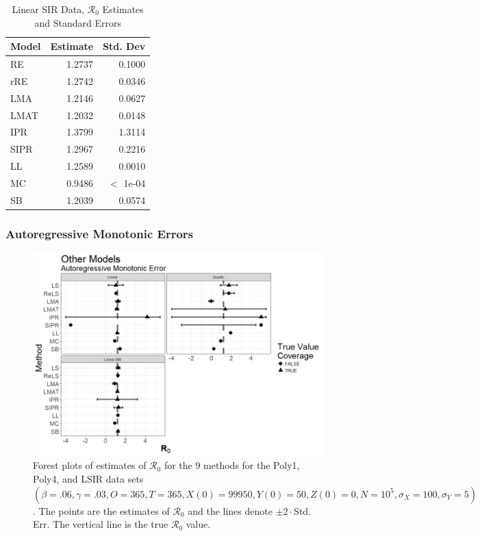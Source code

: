 \documentclass[12pt]{article}
\newcommand{\xxsir}{\ensuremath{9} } %
\newcommand{\rr}{\ensuremath{\mathcal{R}_0}}
\begin{document}
\begin{table}[H]
	
	\centering
	\begin{tabular}[t]{l|r|r}
		\hline
		Model & Estimate & Std. Dev\\
		\hline
		RE & 1.2737 & 0.1000\\
		\hline
		rRE & 1.2742 & 0.0346\\
		\hline
		LMA & 1.2146 & 0.0627\\
		\hline
		LMAT & 1.2032 & 0.0148\\
		\hline
		IPR & 1.3799 & 1.3114\\
		\hline
		SIPR & 1.2967 & 0.2216\\
		\hline
		LL & 1.2589 & 0.0010\\
		\hline
		MC & 0.9486 & $<$ 1e-04\\
		\hline
		SB & 1.2039 & 0.0574\\
		\hline
	\end{tabular}
	\caption{Linear SIR Data, $\rr$ Estimates and Standard Errors}
\end{table}

\subsubsection{Autoregressive Monotonic Errors}

\begin{figure}[H]
	\begin{center}
		\includegraphics[scale=0.5]{images/other_arm.jpeg}
		\caption{Forest plots of estimates of $\rr$ for the \xxsir methods for the Poly1, Poly4, and LSIR data sets $(\beta=.06, \gamma=.03, O=365, T=365, X(0)=99950, Y(0)=50, Z(0)=0, N=10^5, \sigma_X=100, \sigma_Y=5)$.  The points are the estimates of $\rr$ and the lines denote $\pm 2\cdot $Std. Err.  The vertical line is the true $\rr$ value.}
	\end{center}
\end{figure}
\end{document}
